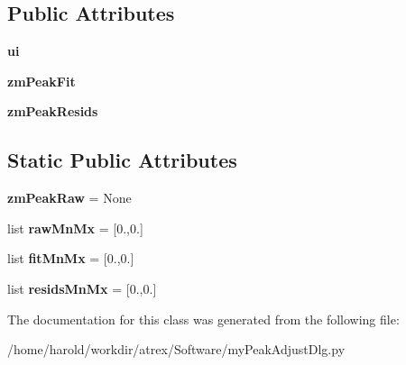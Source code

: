 \subsection*{Public Attributes}
\begin{DoxyCompactItemize}
\item 
\hypertarget{classmyPeakAdjustDlg_1_1myPeakAdjustDlg_a1fc76ecbe349bc391603074a7b2ca8c9}{{\bfseries ui}}\label{classmyPeakAdjustDlg_1_1myPeakAdjustDlg_a1fc76ecbe349bc391603074a7b2ca8c9}

\item 
\hypertarget{classmyPeakAdjustDlg_1_1myPeakAdjustDlg_af1e548deba0b44e985b04f37f53f4976}{{\bfseries zm\-Peak\-Fit}}\label{classmyPeakAdjustDlg_1_1myPeakAdjustDlg_af1e548deba0b44e985b04f37f53f4976}

\item 
\hypertarget{classmyPeakAdjustDlg_1_1myPeakAdjustDlg_a4c928c7791bd418243581ae926f275b6}{{\bfseries zm\-Peak\-Resids}}\label{classmyPeakAdjustDlg_1_1myPeakAdjustDlg_a4c928c7791bd418243581ae926f275b6}

\end{DoxyCompactItemize}
\subsection*{Static Public Attributes}
\begin{DoxyCompactItemize}
\item 
\hypertarget{classmyPeakAdjustDlg_1_1myPeakAdjustDlg_a9c226539269d6b35d50880d49e49dff7}{{\bfseries zm\-Peak\-Raw} = None}\label{classmyPeakAdjustDlg_1_1myPeakAdjustDlg_a9c226539269d6b35d50880d49e49dff7}

\item 
\hypertarget{classmyPeakAdjustDlg_1_1myPeakAdjustDlg_a77033ff8fcc0c925aafb76333050f5c9}{list {\bfseries raw\-Mn\-Mx} = \mbox{[}0.,0.\mbox{]}}\label{classmyPeakAdjustDlg_1_1myPeakAdjustDlg_a77033ff8fcc0c925aafb76333050f5c9}

\item 
\hypertarget{classmyPeakAdjustDlg_1_1myPeakAdjustDlg_a50b584afc0dbc9e5c7dc296325469935}{list {\bfseries fit\-Mn\-Mx} = \mbox{[}0.,0.\mbox{]}}\label{classmyPeakAdjustDlg_1_1myPeakAdjustDlg_a50b584afc0dbc9e5c7dc296325469935}

\item 
\hypertarget{classmyPeakAdjustDlg_1_1myPeakAdjustDlg_a50a4c1e4d7862bb9d67565279fc9ed6e}{list {\bfseries resids\-Mn\-Mx} = \mbox{[}0.,0.\mbox{]}}\label{classmyPeakAdjustDlg_1_1myPeakAdjustDlg_a50a4c1e4d7862bb9d67565279fc9ed6e}

\end{DoxyCompactItemize}


The documentation for this class was generated from the following file\-:\begin{DoxyCompactItemize}
\item 
/home/harold/workdir/atrex/\-Software/my\-Peak\-Adjust\-Dlg.\-py\end{DoxyCompactItemize}

